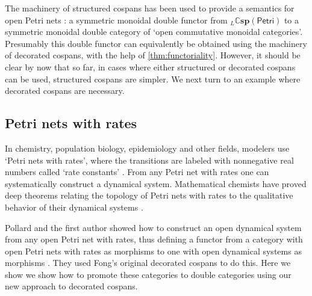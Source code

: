\documentclass[ a4paper, onecolumn, superscriptaddress,10pt, accepted=2022-02-14, issue=3, volume=4, shorttitle=papers/compositionality-4-3 ]{compositionalityarticle}
\newcommand{\Petri}{\mathsf{Petri}}
\newcommand{\double}[1]{\mathbf{\mathbb #1}}
\newcommand{\lCsp}{\double{Csp}}
\begin{document}
The machinery of structured cospans has been used to provide a semantics for open Petri nets \cite{BM}: a symmetric monoidal double functor from ${}_L \lCsp(\Petri)$ to  a symmetric monoidal double category of `open commutative monoidal categories'.  Presumably this double functor can equivalently be obtained using the machinery of decorated cospans, with the help of \cref{thm:functoriality}.  However, it should be clear by now that so far, in cases where either structured or decorated cospans can be used, structured cospans are simpler.   We next turn to an example where decorated cospans are necessary.

\subsection{Petri nets with rates}
\label{subsec:petrirates}

In chemistry, population biology, epidemiology and other fields, modelers use `Petri nets with rates', where the transitions are labeled with nonnegative real numbers called `rate constants' \cite{Haas,Koch,Wilkinson}.   From any Petri net with rates one can systematically construct a dynamical system.  Mathematical chemists have proved deep theorems relating the topology of Petri nets with rates to the qualitative behavior of their dynamical systems \cite{CTF}.

Pollard and the first author showed how to construct an open dynamical system from any open Petri net with rates,  thus defining a functor from a category with open Petri nets with rates as morphisms to one with open dynamical systems as morphisms \cite{BP}.  They used Fong's original decorated cospans to do this.  Here we show we show how to promote these categories to double categories using our new approach to decorated cospans.
\end{document}
